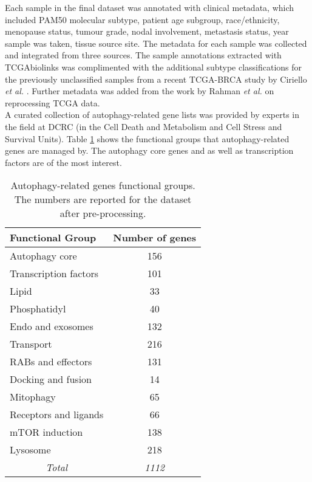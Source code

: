    
    Each sample in the final dataset was annotated with clinical metadata, which included PAM50 molecular subtype, patient age subgroup, race/ethnicity, menopause status, tumour grade, nodal involvement, metastasis status, year sample was taken, tissue source site. 
    The metadata for each sample was collected and integrated from three sources. The sample annotations extracted with TCGAbiolinks was complimented with the additional subtype classifications for the previously unclassified samples from a recent TCGA-BRCA study by Ciriello \textit{et al.} \cite{Ciriello2015ComprehensiveCancer}. Further metadata was added from the work by Rahman \textit{et al. }\cite{RahmanAlternativeResults} on reprocessing TCGA data. \\   
    
        
    A curated collection of autophagy-related gene lists was provided by experts in the field at DCRC (in the Cell Death and Metabolism and Cell Stress and Survival Units). Table \ref{table:autophagy} shows the functional groups that autophagy-related genes are managed by. The autophagy core genes and as well as transcription factors are of the most interest. 
    
    
            \begin{table}[!htbp]
            \centering
            \caption{Autophagy-related genes functional groups. The numbers are reported for the dataset after pre-processing.}
            \label{table:autophagy}
            \begin{tabular}{l|c}
            \small
            \textbf{Functional Group} & \multicolumn{1}{l}{\textbf{Number of genes}} \\ \hline
            Autophagy core & 156 \\ \hline
            Transcription factors & 101 \\ \hline
            Lipid & 33 \\ \hline
            Phosphatidyl & 40 \\ \hline
            Endo and exosomes & 132 \\ \hline
            Transport & 216 \\ \hline
            RABs and effectors & 131 \\ \hline
            Docking and fusion & 14 \\ \hline
            Mitophagy & 65 \\ \hline
            Receptors and ligands & 66 \\ \hline
            mTOR induction & 138 \\ \hline
            Lysosome & 218 \\ \hline
            \multicolumn{1}{c|}{\textit{Total}} & \textit{1112}
            \end{tabular}
            \end{table}
            
